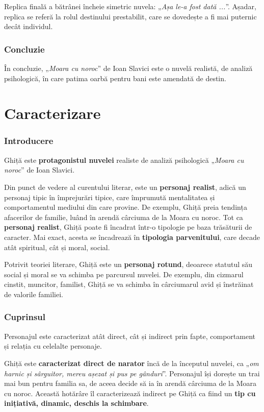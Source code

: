 \documentclass{article}
\newcommand{\qu}[1]{„\emph{#1}”}
\begin{document}
Replica finală a bătrânei încheie simetric nuvela: \qu{Așa le-a fost dată ...}. Așadar, replica se referă la rolul destinului prestabilit, care se dovedește a fi mai puternic decât individul.

\section{Concluzie}
În concluzie, \qu{Moara cu noroc} de Ioan Slavici este o nuvelă realistă, de analiză psihologică, în care patima oarbă pentru bani este amendată de destin.

\part*{Caracterizare}
\setcounter{section}{0}
\section{Introducere}
Ghiță este \textbf{protagonistul nuvelei} realiste de analiză psihologică \qu{Moara cu noroc} de Ioan Slavici.

Din punct de vedere al curentului literar, este un \textbf{personaj realist}, adică un personaj tipic în împrejurări tipice, care împrumută mentalitatea și comportamentul mediului din care provine. De exemplu, Ghiță preia tendința afacerilor de familie, luând în arendă cârciuma de la Moara cu noroc. Tot ca \textbf{personaj realist}, Ghiță poate fi încadrat într-o tipologie pe baza trăsăturii de caracter. Mai exact, acesta se încadrează în \textbf{tipologia parvenitului}, care decade atât spiritual, cât și moral, social.

Potrivit teoriei literare, Ghiță este un \textbf{personaj rotund}, deoarece statutul său social și moral se va schimba pe parcursul nuvelei. De exemplu, din cizmarul cinstit, muncitor, familist, Ghiță se va schimba în cârciumarul avid și înstrăinat de valorile familiei.

\section{Cuprinsul}
Personajul este caracterizat atât direct, cât și indirect prin fapte, comportament și relația cu celelalte personaje.

Ghiță este \textbf{caracterizat direct de narator} încă de la începutul nuvelei, ca \qu{om harnic și sârguitor, mereu așezat și pus pe gânduri}. Personajul își dorește un trai mai bun pentru familia sa, de aceea decide să ia în arendă cârciuma de la Moara cu noroc. Această hotărâre îl caracterizează indirect pe Ghiță ca fiind un \textbf{tip cu inițiativă, dinamic, deschis la schimbare}.
\end{document}
